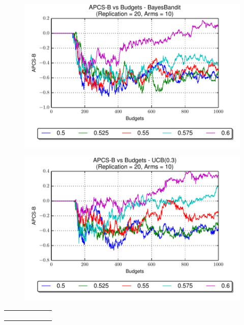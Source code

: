 \documentclass[compress]{beamer}
\begin{document}
\begin{frame}
\smaller
\begin{minipage}{0.48\textwidth}
\begin{figure}[p]
    \centering
    \includegraphics[page=1,width=\textwidth]{7BayesBandit_rate_series_pcs.pdf}
\end{figure}
\begin{figure}[p]
    \centering
    \includegraphics[page=1,width=\textwidth]{9UCB_rate_series_pcs.pdf}
\end{figure}
\end{minipage}%
\hfill
\begin{minipage}{0.48\textwidth}
\begin{tabular}{p{\textwidth}}
\begin{figure}[p]
    \centering

\end{figure}
\end{tabular}
\end{minipage}
\end{frame}
\end{document}
